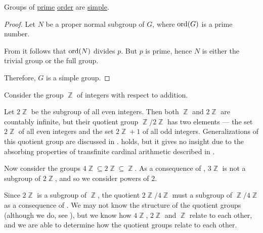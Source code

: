\begin{corollary}\label{thm:prime_groups_are_simple}
  Groups of \hyperref[def:prime_number]{prime} \hyperref[def:group_order]{order} are \hyperref[def:simple_object]{simple}.
\end{corollary}
\begin{proof}
  Let \( N \) be a proper normal subgroup of \( G \), where \( \operatorname{ord}(G) \) is a prime number.

  From  it follows that \( \operatorname{ord}(N) \) divides \( p \). But \( p \) is prime, hence \( N \) is either the trivial group or the full group.

  Therefore, \( G \) is a simple group.
\end{proof}

\begin{example}\label{ex:subgroups_of_integers}
  Consider the group \( \BbbZ \) of integers with respect to addition.

  Let \( 2\BbbZ \) be the subgroup of all even integers. Then both \( \BbbZ \) and \( 2\BbbZ \) are countably infinite, but their quotient group \( \BbbZ / 2\BbbZ \) has two elements --- the set \( 2\BbbZ \) of all even integers and the set \( 2\BbbZ + 1 \) of all odd integers. Generalizations of this quotient group are discussed in .  holds, but it gives no insight due to the absorbing properties of transfinite cardinal arithmetic described in .

  Now consider the groups \( 4\BbbZ \subseteq 2\BbbZ \subseteq \BbbZ \). As a consequence of , \( 3\BbbZ \) is not a subgroup of \( 2\BbbZ \), and so we consider powers of \( 2 \).

  Since \( 2\BbbZ \) is a subgroup of \( \BbbZ \), the quotient \( 2\BbbZ / 4\BbbZ \) must a subgroup of \( \BbbZ / 4\BbbZ \) as a consequence of . We may not know the structure of the quotient groups (although we do, see ), but we know how \( 4\BbbZ \), \( 2\BbbZ \) and \( \BbbZ \) relate to each other, and we are able to determine how the quotient groups relate to each other.
\end{example}
